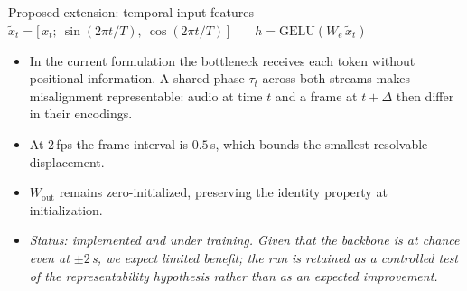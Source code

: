 \documentclass[aspectratio=169,11pt]{beamer}
\begin{document}
\begin{frame}{Proposed extension: temporal input features}
\centering\footnotesize
$\tilde x_t = \big[\,x_t;\ \sin(2\pi t/T),\ \cos(2\pi t/T)\,\big]
\qquad h = \mathrm{GELU}(W_e\,\tilde x_t)$
\vspace{0.3em}
\par
{}
\vfill
\begin{itemize}\footnotesize
\item In the current formulation the bottleneck receives each token without positional information.
A shared phase $\tau_t$ across both streams makes misalignment representable: audio at time $t$ and a
frame at $t+\Delta$ then differ in their encodings.
\item At 2\,fps the frame interval is $0.5$\,s, which bounds the smallest resolvable displacement.
\item $W_{\text{out}}$ remains zero-initialized, preserving the identity property at initialization.
\item[] {\footnotesize\emph{Status: implemented and under training. Given that the backbone is at
chance even at $\pm2$\,s, we expect limited benefit; the run is retained as a controlled test of the
representability hypothesis rather than as an expected improvement.}}
\end{itemize}
\end{frame}

\end{document}
